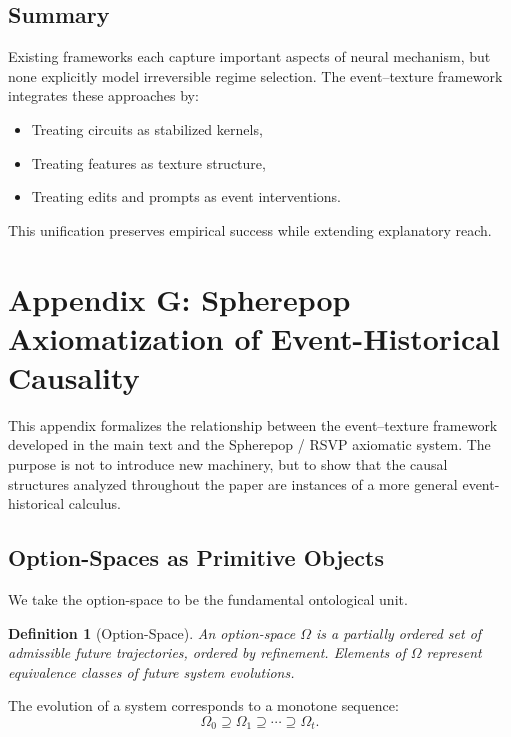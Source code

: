 \documentclass[11pt]{article}
\newtheorem{definition}{Definition}
\theoremstyle{remark}
\begin{document}
\subsection{Summary}

Existing frameworks each capture important aspects of neural
mechanism, but none explicitly model irreversible regime selection.
The event–texture framework integrates these approaches by:
\begin{itemize}
\item Treating circuits as stabilized kernels,
\item Treating features as texture structure,
\item Treating edits and prompts as event interventions.
\end{itemize}

This unification preserves empirical success while extending
explanatory reach.

\section{Appendix G: Spherepop Axiomatization of Event-Historical Causality}

This appendix formalizes the relationship between the event–texture
framework developed in the main text and the Spherepop / RSVP
axiomatic system. The purpose is not to introduce new machinery, but
to show that the causal structures analyzed throughout the paper are
instances of a more general event-historical calculus.

\subsection{Option-Spaces as Primitive Objects}

We take the option-space to be the fundamental ontological unit.

\begin{definition}[Option-Space]
An option-space $\Omega$ is a partially ordered set of admissible
future trajectories, ordered by refinement. Elements of $\Omega$
represent equivalence classes of future system evolutions.
\end{definition}

The evolution of a system corresponds to a monotone sequence:
\[
\Omega_0 \supseteq \Omega_1 \supseteq \cdots \supseteq \Omega_t.
\]
\end{document}
